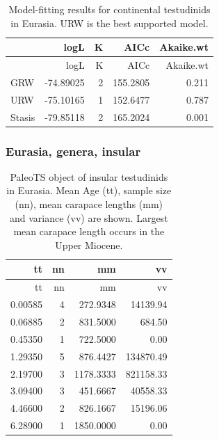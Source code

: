 \begin{longtable}[]{@{}lrrrr@{}}
	\caption[Model fits for continental \T in Eurasia]{Model-fitting results for continental testudinids in Eurasia. URW is the best supported model.}
	\label{tab:pTSEsC}
	\tabularnewline
	\toprule
	& logL & K & AICc & Akaike.wt\tabularnewline
	\midrule
	\endfirsthead
	\toprule
	& logL & K & AICc & Akaike.wt\tabularnewline
	\midrule
	\endhead
	GRW & -74.89025 & 2 & 155.2805 & 0.211\tabularnewline
	URW & -75.10165 & 1 & 152.6477 & 0.787\tabularnewline
	Stasis & -79.85118 & 2 & 165.2024 & 0.001\tabularnewline
	\bottomrule
\end{longtable}


\FloatBarrier

\subsubsection*{Eurasia, genera,
	insular}\label{eurasiagenera-insular}

\begin{longtable}[]{@{}rrrr@{}}
	\caption[PaleoTS object of insular \T in Eurasia]{PaleoTS object of insular testudinids in Eurasia. Mean Age (tt), sample size (nn), mean carapace lengths (mm) and variance (vv) are shown. Largest mean carapace length occurs in the Upper Miocene.}
	\tabularnewline
	\toprule
	tt & nn & mm & vv\tabularnewline
	\midrule
	\endfirsthead
	\toprule
	tt & nn & mm & vv\tabularnewline
	\midrule
	\endhead
	0.00585 & 4 & 272.9348 & 14139.94\tabularnewline
	0.06885 & 2 & 831.5000 & 684.50\tabularnewline
	0.45350 & 1 & 722.5000 & 0.00\tabularnewline
	1.29350 & 5 & 876.4427 & 134870.49\tabularnewline
	2.19700 & 3 & 1178.3333 & 821158.33\tabularnewline
	3.09400 & 3 & 451.6667 & 40558.33\tabularnewline
	4.46600 & 2 & 826.1667 & 15196.06\tabularnewline
	6.28900 & 1 & 1850.0000 & 0.00\tabularnewline
	\bottomrule
\end{longtable}


